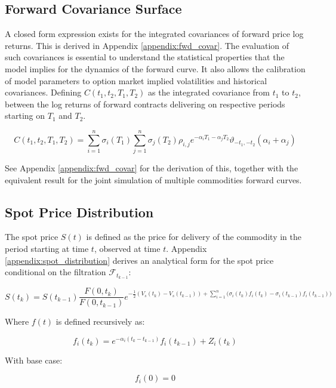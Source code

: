 \documentclass{article}
\begin{document}
\subsection{Forward Covariance Surface}
A closed form expression exists for the integrated covariances of
forward price log returns. This is derived in Appendix \ref{appendix:fwd_covar}. The evaluation of such 
covariances is essential to
understand the statistical properties that the model implies for the dynamics of 
the forward curve. It also allows the calibration of model parameters to option
market implied volatilities and historical covariances. 
Defining $C(t_1, t_2, T_1, T_2)$
as the integrated covariance from $t_1$ to $t_2$, between the log returns of forward 
contracts delivering on respective periods starting on $T_1$ and $T_2$.

\begin{equation}
    C(t_1, t_2, T_1, T_2) = \sum_{i=1}^n \sigma_i(T_1) \sum_{j=1}^n \sigma_j(T_2) \rho_{i,j} 
    e^{-\alpha_i T_1 -\alpha_j T_2} \vartheta_{-t_1, -t_2}(\alpha_i + \alpha_j)
\end{equation}

See Appendix \ref{appendix:fwd_covar} for the derivation of this, together with
the equivalent result for the joint simulation of multiple commodities forward curves.

\subsection{Spot Price Distribution}
The spot price $S(t)$ is defined as the price for delivery of the commodity in the period
starting at time $t$, observed at time $t$. Appendix \ref{appendix:spot_distribution}
derives an analytical form for the spot price conditional on the  filtration 
$\mathcal{F}_{t_{k-1}}$:

\begin{equation}
    S(t_k) = S(t_{k-1}) \frac{F(0, t_k)}{F(0, t_{k-1})} e^{- \frac{1}{2} (V_s(t_k) - 
    V_s(t_{k-1})) + \sum_{i=1}^n \bigl(\sigma_i(t_k)f_i(t_k) - \sigma_i(t_{k-1})f_i(t_{k-1})\bigr)}
\end{equation}

Where $f(t)$ is defined recursively as:

\begin{equation}
    f_i(t_k) = e^{-\alpha_i(t_k - t_{k-1})}f_i(t_{k-1}) + Z_i(t_k)
\end{equation}

With base case:

\begin{equation}
    f_i(0) = 0
\end{equation}
\end{document}
